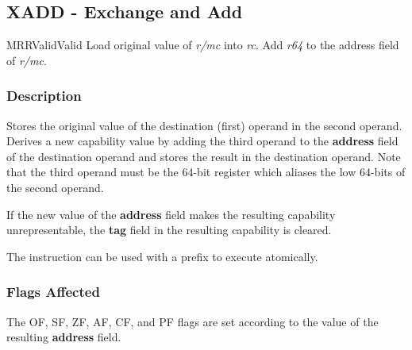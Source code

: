 \clearpage
{}
{}
\subsection*{XADD - Exchange and Add}

\begin{x86opcodetable}
  {MRR}{Valid}{Valid}
  {Load original value of \emph{r/mc} into \emph{rc}.  Add \emph{r64}
    to the address field of \emph{r/mc}.}
\end{x86opcodetable}

\begin{x86opentable}
\end{x86opentable}

\subsubsection*{Description}

Stores the original value of the destination (first) operand in the second
operand.  Derives a new capability value by adding the third operand
to the \textbf{address} field of the destination operand and stores
the result in the destination operand.  Note that the third operand
must be the 64-bit register which aliases the low 64-bits of the
second operand.

If the new value of the \textbf{address} field makes the resulting
capability unrepresentable, the \textbf{tag} field in the resulting
capability is cleared.

The instruction can be used with a  prefix to execute
atomically.

\subsubsection*{Flags Affected}

The OF, SF, ZF, AF, CF, and PF flags are set according to the value of
the resulting \textbf{address} field.

